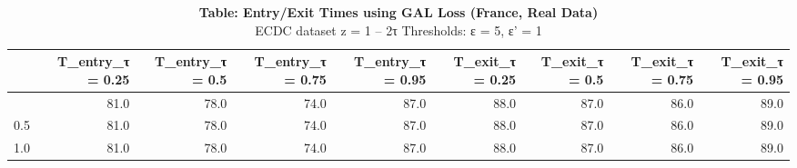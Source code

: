 \begin{table}[t]
\caption*{
{\large \textbf{Table: Entry/Exit Times using GAL Loss (France, Real Data)}} \\ 
{\small ECDC dataset \textbar{} z = 1 -- 2τ \textbar{} Thresholds: ε = 5, ε' = 1}
} 
\begin{tabular*}{\linewidth}{@{\extracolsep{\fill}}l|rrrrrrrr}
\toprule
 & T\_entry\_τ = 0.25 & T\_entry\_τ = 0.5 & T\_entry\_τ = 0.75 & T\_entry\_τ = 0.95 & T\_exit\_τ = 0.25 & T\_exit\_τ = 0.5 & T\_exit\_τ = 0.75 & T\_exit\_τ = 0.95 \\ 
\midrule\addlinespace[2.5pt]
0.1 & 81.0 & 78.0 & 74.0 & 87.0 & 88.0 & 87.0 & 86.0 & 89.0 \\ 
0.5 & 81.0 & 78.0 & 74.0 & 87.0 & 88.0 & 87.0 & 86.0 & 89.0 \\ 
1.0 & 81.0 & 78.0 & 74.0 & 87.0 & 88.0 & 87.0 & 86.0 & 89.0 \\ 
\bottomrule
\end{tabular*}
\end{table}

